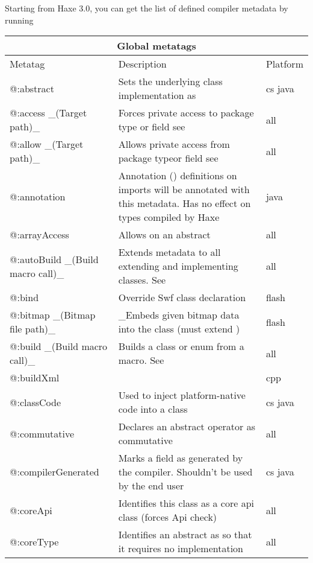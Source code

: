 Starting from Haxe 3.0, you can get the list of defined compiler metadata by running 

\begin{center}
\begin{tabular}{| l | l | l |}
	\hline
	\multicolumn{3}{|c|}{Global metatags} \\ \hline
	Metatag &  Description  &  Platform \\ \hline
	@:abstract &  Sets the underlying class implementation as \tref{abstract type}{types-abstract}  &  cs  java \\
	@:access \_(Target path)\_  &   Forces private access to package  type or field  see \tref{Access Control}{lf-access-control}  &  all \\
	@:allow \_(Target path)\_  &   Allows private access from package  typeor field  see \tref{Access Control}{lf-access-control}  &  all \\
	@:annotation  &  Annotation (\expr{@interface}) definitions on \expr{-java-lib} imports will be annotated with this metadata. Has no effect on types compiled by Haxe   &  java \\
	@:arrayAccess  &  Allows \tref{Array access}{types-abstract-array-access} on an abstract  &  all \\
	@:autoBuild \_(Build macro call)\_  &   Extends \expr{@:build} metadata to all extending and implementing classes. See \tref{Macro autobuild}{macro-auto-build}  &  all \\
	@:bind  &  Override Swf class declaration  &  flash \\
	@:bitmap \_(Bitmap file path)\_  &  \_Embeds given bitmap data into the class (must extend \expr{flash.display.BitmapData})   &  flash \\
	@:build \_(Build macro call)\_  &   Builds a class or enum from a macro. See \tref{Type Building}{macro-type-building}  &  all \\
	@:buildXml  &    &  cpp \\
	@:classCode  &  Used to inject platform-native code into a class  &  cs  java \\
	@:commutative  &  Declares an abstract operator as commutative  &  all \\
	@:compilerGenerated  &  Marks a field as generated by the compiler. Shouldn't be used by the end user  &  cs  java \\
	@:coreApi &  Identifies this class as a core api class (forces Api check)  &  all \\
	@:coreType  &  Identifies an abstract as \tref{core type}{types-abstract-core-type} so that it requires no implementation  &  all \\

\end{tabular}
\end{center}
